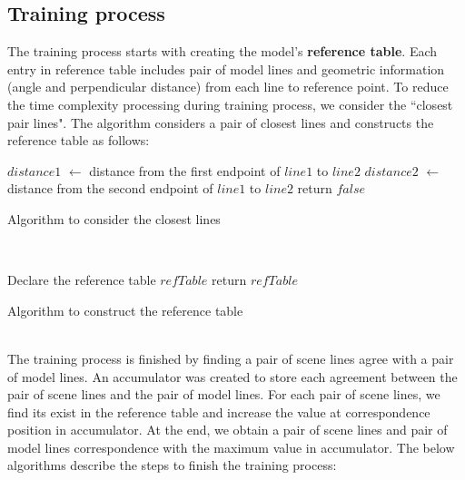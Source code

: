 \subsection{Training process}
The training process starts with creating the model's \textbf{reference table}. Each entry in reference table includes pair of model lines and geometric information (angle and perpendicular distance) from each line to reference point. To reduce the time complexity processing during training process, we consider the ``closest pair lines". The algorithm considers a pair of closest lines and constructs the reference table as follows:\\[0.2cm]
\begin{algorithm}[H]
\Indm 
{}
\SetAlgoLined
{}
\Indp
$distance1$ $\leftarrow$ distance from the first endpoint of $line1$ to $line2$\;
$distance2$ $\leftarrow$  distance from the second endpoint of $line1$ to $line2$\;
return $false$\;
\caption{Algorithm to consider the closest lines}
\end{algorithm}~\\[0.2cm]
\begin{algorithm}[H]
\Indm 
{}
\SetAlgoLined
{}
\Indp
Declare the reference table $refTable$ \;
return $refTable$ \;
\caption{Algorithm to construct the reference table}
\end{algorithm}~\\
The training process is finished by finding a pair of scene lines agree with a pair of model lines. An accumulator was created to store each agreement between the pair of scene lines and the pair of model lines. For each pair of scene lines, we find its exist in the reference table and increase the value at correspondence position in accumulator. At the end, we obtain a pair of scene lines and pair of model lines correspondence with the maximum value in accumulator. The below algorithms describe the steps to finish the training process:
